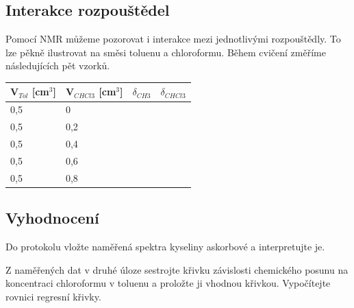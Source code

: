 \documentclass[12pt]{article}
\begin{document}
\subsection{Interakce rozpouštědel}

Pomocí NMR můžeme pozorovat i interakce mezi jednotlivými rozpouštědly. To lze pěkně ilustrovat na směsi toluenu a chloroformu. Během cvičení změříme následujících pět vzorků.
\\

\begin{tabular}{|l|l|l|l|}
	\hline
	\textbf{V$_{Tol}$ [cm$^3$]} & \textbf{V$_{CHCl3}$ [cm$^3$]} & \textbf{$\delta_{CH3}$} 
	& \textbf{$\delta_{CHCl3}$} \\\hline
	0,5 & 0 & & \\\hline
	0,5 & 0,2 & & \\\hline
	0,5 & 0,4 & & \\\hline
	0,5 & 0,6 & & \\\hline
	0,5 & 0,8 & & \\\hline
\end{tabular}

\subsection{Vyhodnocení}

Do protokolu vložte naměřená spektra kyseliny askorbové a interpretujte je. 

Z naměřených dat v druhé úloze sestrojte křivku závislosti chemického posunu na koncentraci chloroformu v toluenu a proložte ji vhodnou křivkou. Vypočítejte rovnici regresní křivky.
\end{document}
